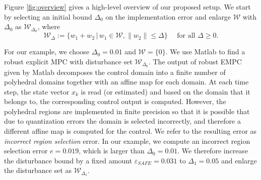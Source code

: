 
	
Figure \ref{fig:overview} gives a high-level overview of our proposed setup.
We start by selecting an initial bound $\Delta_0$ on the implementation error and enlarge $\mathcal W$ with $\Delta_0$ as $\mathcal W_{\Delta_0}$, where
\begin{equation}\label{eq:W_delta}
\mathcal W_{\Delta} := \{w_1+w_2 \,|\, w_1\in \mathcal W, \|w_2\|\le \Delta\}
\quad\text{ for all } \Delta\ge 0.
\end{equation}
 
For our example, we choose $\Delta_0=0.01$ and $\mathcal W = \{0\}$. 
We use Matlab to find a robust explicit MPC with disturbance set $\mathcal W_{\Delta_0}$. 
%
The output of robust EMPC given by Matlab decomposes the control domain into a
finite number of polyhedral domains together with an affine map for each domain. 
At each time step, the state vector $x_k$ is read (or estimated) and based on the domain
that it belongs to, the corresponding control output is computed. 
However, the polyhedral regions are implemented in finite precision so that
it is possible that due to quantization errors the domain is selected incorrectly, and therefore
a different affine map is computed for the control.
We refer to the resulting error as \emph{incorrect region selection} error.
In our example, we compute an incorrect region selection error $e = 0.019$, which is larger
than $\Delta_0=0.01$. We therefore increase the disturbance bound by a fixed amount $\varepsilon_{SAFE}=0.031$ to
$\Delta_1 = 0.05$ and enlarge the disturbance set as $\mathcal W_{\Delta_1}$. 


